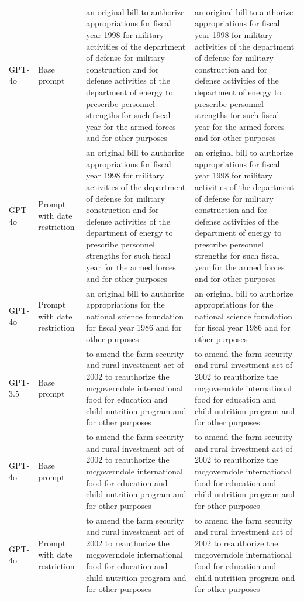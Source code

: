 \begin{longtable}{>{\raggedright\arraybackslash}p{1.4cm}>{\raggedright\arraybackslash}p{1.4cm}>{\raggedright\arraybackslash}p{5.5cm}>{\raggedright\arraybackslash}p{5.5cm}}
GPT-4o & Base prompt & an original bill to authorize appropriations for fiscal year 1998 for military activities of the department of defense for military construction and for defense activities of the department of energy to prescribe personnel strengths for such fiscal year for the armed forces and for other purposes & an original bill to authorize appropriations for fiscal year 1998 for military activities of the department of defense for military construction and for defense activities of the department of energy to prescribe personnel strengths for such fiscal year for the armed forces and for other purposes\\
GPT-4o & Prompt with date restriction & an original bill to authorize appropriations for fiscal year 1998 for military activities of the department of defense for military construction and for defense activities of the department of energy to prescribe personnel strengths for such fiscal year for the armed forces and for other purposes & an original bill to authorize appropriations for fiscal year 1998 for military activities of the department of defense for military construction and for defense activities of the department of energy to prescribe personnel strengths for such fiscal year for the armed forces and for other purposes\\
GPT-4o & Prompt with date restriction & an original bill to authorize appropriations for the national science foundation for fiscal year 1986 and for other purposes & an original bill to authorize appropriations for the national science foundation for fiscal year 1986 and for other purposes\\
GPT-3.5 & Base prompt & to amend the farm security and rural investment act of 2002 to reauthorize the mcgoverndole international food for education and child nutrition program and for other purposes & to amend the farm security and rural investment act of 2002 to reauthorize the mcgoverndole international food for education and child nutrition program and for other purposes\\
GPT-4o & Base prompt & to amend the farm security and rural investment act of 2002 to reauthorize the mcgoverndole international food for education and child nutrition program and for other purposes & to amend the farm security and rural investment act of 2002 to reauthorize the mcgoverndole international food for education and child nutrition program and for other purposes\\
GPT-4o & Prompt with date restriction & to amend the farm security and rural investment act of 2002 to reauthorize the mcgoverndole international food for education and child nutrition program and for other purposes & to amend the farm security and rural investment act of 2002 to reauthorize the mcgoverndole international food for education and child nutrition program and for other purposes\\

\end{longtable}
